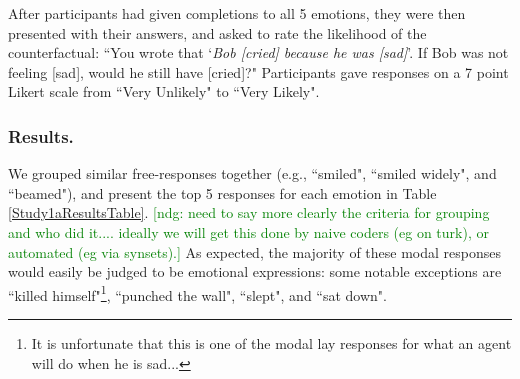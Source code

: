 \documentclass[10pt,letterpaper]{article}
\newcommand{\ndg}[1]{\textcolor{Green}{[ndg: #1]}}
\begin{document}
After participants had given completions to all 5 emotions, they were then presented with their answers, and asked to rate the likelihood of the counterfactual: ``You wrote that `\textit{Bob [cried] because he was [sad]}'. If Bob was not feeling [sad], would he still have [cried]?" Participants gave responses on a 7 point Likert scale from ``Very Unlikely" to ``Very Likely". 




\subsubsection{Results.} 
We grouped similar free-responses together (e.g., ``smiled", ``smiled widely", and ``beamed"), and present the top 5 responses for each emotion in Table \ref{Study1aResultsTable}. 
\ndg{need to say more clearly the criteria for grouping and who did it.... ideally we will get this done by naive coders (eg on turk), or automated (eg via synsets).}
As expected, the majority of these modal responses would easily be judged to be emotional expressions: some notable exceptions are ``killed himself"\footnote{It is unfortunate that this is one of the modal lay responses for what an agent will do when he is sad...}, ``punched the wall", ``slept", and ``sat down".


\begin{table}
\caption{ Action nominations from emotions (Study 1a). Top 5 responses for each emotion, with nomination counts in parentheses. The most common responses for anger were variants of ``hit X", where X is an object or person (of these, the modal response was: ``punched the wall"). }
\label{Study1aResultsTable}
\end{table}
\end{document}
